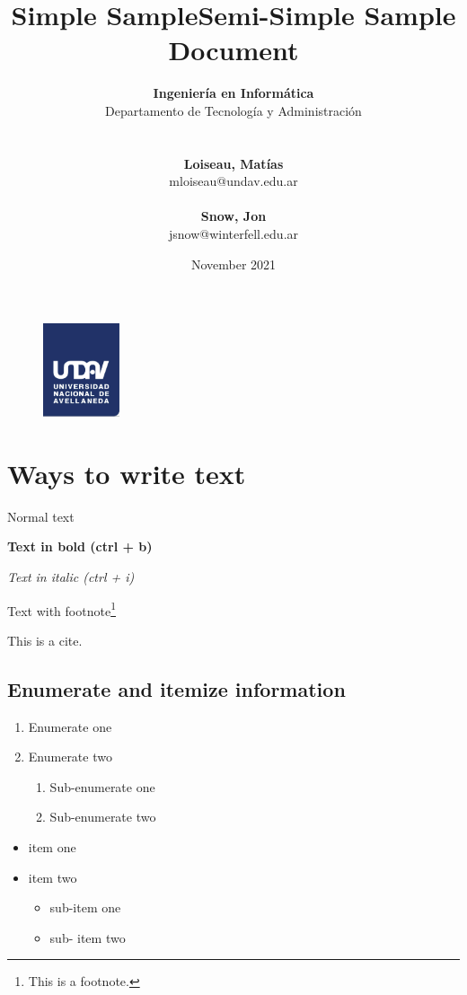 \documentclass{article} %
\title{Simple Sample} %
\author{
	\textbf{Ingeniería en Informática}\\
	Departamento de Tecnología y Administración\\
	\\~\\
	\textbf{Loiseau, Matías}\\
	mloiseau@undav.edu.ar
 	\\~\\
 	\textbf{Snow, Jon}\\
 	jsnow@winterfell.edu.ar
}
\title{Semi-Simple Sample Document}
\date{November 2021}
\begin{document}

\begin{figure}
\centering
	\includegraphics[width=0.2\textwidth]{images/undav-logo}
	\label{fig:undav-logo}
\end{figure}
\maketitle %

\thispagestyle{empty} %
\cleardoublepage

\cleardoublepage
\tableofcontents %
\cleardoublepage

\section{Ways to write text} %
Normal text

\textbf{Text in bold (ctrl + b)}

\textit{Text in italic (ctrl + i)}

Text with footnote\footnote{This is a footnote.}

This is a cite\cite{knn}.

\subsection{Enumerate and itemize information}

\begin{enumerate}
	\item Enumerate one
	\item Enumerate two
	\begin{enumerate}
		\item Sub-enumerate one
		\item Sub-enumerate two
	\end{enumerate}
\end{enumerate}

\begin{itemize}
	\item item one
	\item item two
	\begin{itemize}
		\item sub-item one
		\item sub-	item two
	\end{itemize}
\end{itemize}
\end{document}
